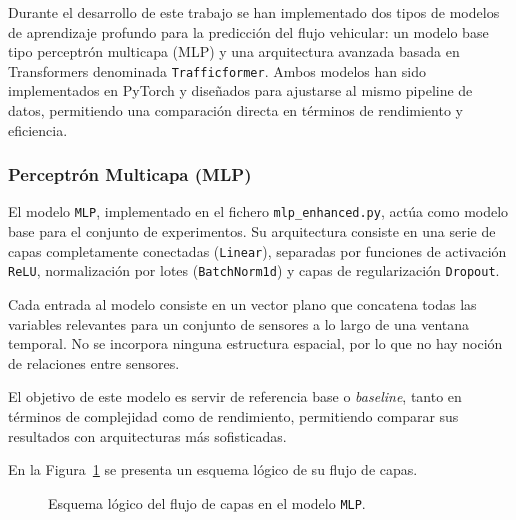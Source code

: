 Durante el desarrollo de este trabajo se han implementado dos tipos de modelos de aprendizaje profundo para la predicción del flujo vehicular: un modelo base tipo perceptrón multicapa (MLP) y una arquitectura avanzada basada en Transformers denominada \texttt{Trafficformer}. Ambos modelos han sido implementados en PyTorch y diseñados para ajustarse al mismo pipeline de datos, permitiendo una comparación directa en términos de rendimiento y eficiencia.

\subsubsection*{Perceptrón Multicapa (MLP)}

El modelo \texttt{MLP}, implementado en el fichero \texttt{mlp\_enhanced.py}, actúa como modelo base para el conjunto de experimentos. Su arquitectura consiste en una serie de capas completamente conectadas (\texttt{Linear}), separadas por funciones de activación \texttt{ReLU}, normalización por lotes (\texttt{BatchNorm1d}) y capas de regularización \texttt{Dropout}.

Cada entrada al modelo consiste en un vector plano que concatena todas las variables relevantes para un conjunto de sensores a lo largo de una ventana temporal. No se incorpora ninguna estructura espacial, por lo que no hay noción de relaciones entre sensores.

El objetivo de este modelo es servir de referencia base o \textit{baseline}, tanto en términos de complejidad como de rendimiento, permitiendo comparar sus resultados con arquitecturas más sofisticadas.

En la Figura~\ref{fig:mlp_enhanced_vertical} se presenta un esquema lógico de su flujo de capas.

\begin{figure}[H]
	\centering
	\caption{Esquema lógico del flujo de capas en el modelo \texttt{MLP}.}
	\label{fig:mlp_enhanced_vertical}
\end{figure}

